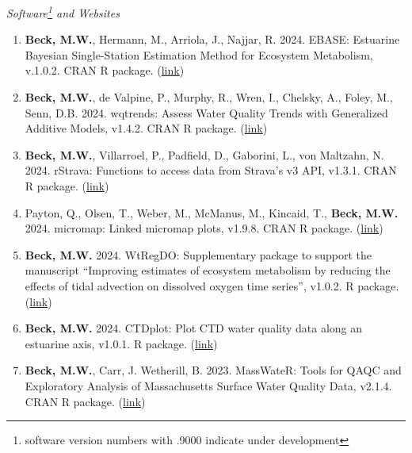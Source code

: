 \documentclass[letterpaper,12pt]{article}
\begin{document}
\vspace{\baselineskip} 
\centerline{\large{\textit{Software\footnote{software version numbers with .9000 indicate under development} and Websites}}}

\begin{enumerate}

\item \textbf{Beck, M.W.}, Hermann, M., Arriola, J., Najjar, R. 2024. EBASE: Estuarine Bayesian Single-Station Estimation Method for Ecosystem Metabolism, v.1.0.2. CRAN R package. ({\footnotesize\href{https://fawda123.github.io/EBASE/}{link}})

\item \textbf{Beck, M.W.}, de Valpine, P., Murphy, R., Wren, I., Chelsky, A., Foley, M., Senn, D.B. 2024. wqtrends: Assess Water Quality Trends with Generalized Additive Models, v1.4.2. CRAN R package. ({\footnotesize\href{https://tbep-tech.github.io/wqtrends/}{link}})

\item \textbf{Beck, M.W.}, Villarroel, P., Padfield, D., Gaborini, L., von Maltzahn, N. 2024. rStrava: Functions to access data from Strava's v3 API, v1.3.1. CRAN R package. ({\footnotesize\href{https://cran.r-project.org/web/packages/rStrava/index.html}{link}})

\item Payton, Q., Olsen, T., Weber, M., McManus, M., Kincaid, T., \textbf{Beck, M.W.} 2024. micromap: Linked micromap plots, v1.9.8. CRAN R package. ({\footnotesize\href{https://cran.r-project.org/web/packages/micromap/index.html}{link}})

\item \textbf{Beck, M.W.} 2024. WtRegDO: Supplementary package to support the manuscript ``Improving estimates of ecosystem metabolism by reducing the effects of tidal advection on dissolved oxygen time series'', v1.0.2. R package. ({\footnotesize\href{http://github.com/fawda123/WtRegDO}{link}})

\item \textbf{Beck, M.W.} 2024. CTDplot: Plot CTD water quality data along an estuarine axis, v1.0.1. R package. ({\footnotesize\href{https://github.com/fawda123/CTDplot}{link}})

\item \textbf{Beck, M.W.}, Carr, J. Wetherill, B. 2023. MassWateR: Tools for QAQC and Exploratory Analysis of Massachusetts Surface Water Quality Data, v2.1.4. CRAN R package. ({\footnotesize\href{https://massbays-tech.github.io/MassWateR/}{link}})


\end{enumerate}
\end{document}
